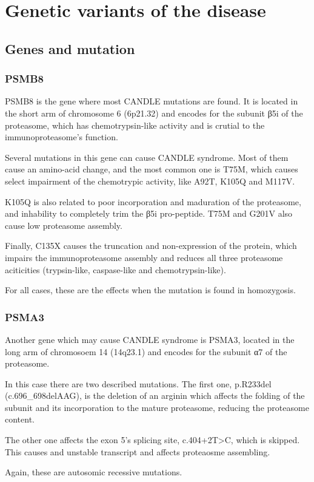 \documentclass[a4paper,10pt]{report}
\begin{document}
\chapter{Genetic variants of the disease}

\section{Genes and mutation}
\subsection{PSMB8}

PSMB8 is the gene where most CANDLE mutations are found. It is located in the short arm of chromosome 6 (6p21.32) and encodes for the subunit β5i of the proteasome, which has chemotrypsin-like activity and is crutial to the immunoproteasome's function.\par
Several mutations in this gene can cause CANDLE syndrome. Most of them cause an amino-acid change, and the most common one is T75M, which causes select impairment of the chemotrypic activity, like A92T, K105Q and M117V.\par
K105Q is also related to poor incorporation and maduration of the proteasome, and inhability to completely trim the β5i pro-peptide. T75M and G201V also cause low proteasome assembly.\par
Finally, C135X causes the truncation and non-expression of the protein, which impairs the immunoproteasome assembly and reduces all three proteasome aciticities (trypsin-like, caspase-like and chemotrypsin-like).\par
For all cases, these are the effects when the mutation is found in homozygosis.

\subsection{PSMA3}

Another gene which may cause CANDLE syndrome is PSMA3, located in the long arm of chromosoem 14 (14q23.1) and encodes for the subunit α7 of the proteasome.\par
In this case there are two described mutations. The first one, p.R233del (c.696_698delAAG), is the deletion of an arginin which affects the folding of the subunit and its incorporation to the mature proteasome, reducing the proteasome content.\par
The other one affects the exon 5's splicing site, c.404+2T>C, which is skipped. This causes and unstable transcript and affects proteaosme assembling.\par
Again, these are autosomic recessive mutations.
\end{document}
